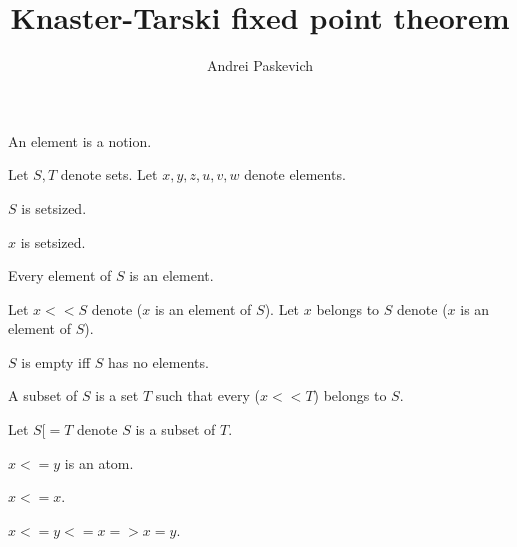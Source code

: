 \documentclass{article}
\title{Knaster-Tarski fixed point theorem}
\author{Andrei Paskevich}
\date{}
\begin{document}

  \maketitle

  \begin{forthel}

    \begin{signature}
      An element is a notion.
    \end{signature}

    Let $S,T$ denote sets.
    Let $x,y,z,u,v,w$ denote elements.

    \begin{axiom}
      $S$ is setsized.
    \end{axiom}

    \begin{axiom}
      $x$ is setsized.
    \end{axiom}

    \begin{axiom}
      Every element of $S$ is an element.
    \end{axiom}

    Let $x << S$ denote ($x$ is an element of $S$).
    Let $x$ belongs to $S$ denote ($x$ is an element of $S$).

    \begin{definition}[DefEmpty]
      $S$ is empty iff $S$ has no elements.
    \end{definition}

    \begin{definition}[DefSub]
      A subset of $S$ is a set $T$ such that every ($x << T$) belongs to $S$.
    \end{definition}

    Let $S [= T$ denote $S$ is a subset of $T$.

    \begin{signature}[LessRel]
      $x <= y$ is an atom.
    \end{signature}

    \begin{axiom}[ARefl]
      $x <= x$.
    \end{axiom}

    \begin{axiom}[ASymm]
      $x <= y <= x => x = y$.
    \end{axiom}


\end{forthel}
\end{document}
